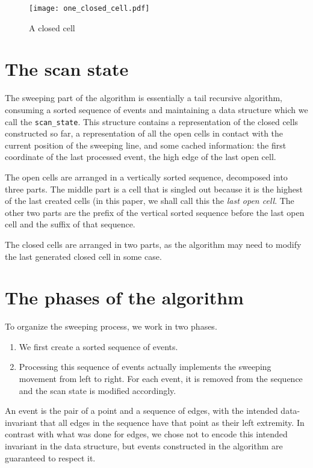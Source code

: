 \documentclass[a4paper, USenglish, cleveref, autoref, thm-restate, final]{lipics-v2021}
\begin{document}
\begin{figure}
\texttt{[image: one\_closed\_cell.pdf]}
\caption{A closed cell}
\end{figure}


\section{The scan state}

The sweeping part of the algorithm is essentially a tail recursive
algorithm, consuming a sorted sequence of events and
maintaining a data structure which we call the {\tt scan\_state}.  This
structure contains a representation of the closed cells constructed so
far, a representation of all the open cells in contact with the
current position of the sweeping line, and some cached information:
the first coordinate of the last processed event, the high edge of the
last open cell.

The open cells are arranged in a vertically sorted sequence,
decomposed into three parts.  The middle part is a cell that is singled
out because it is the highest of the last created cells (in this
paper, we shall call this the {\em last open cell}.  The other two
parts are the prefix of the vertical sorted sequence before the last
open cell and the suffix of that sequence.

The closed cells are arranged in two parts, as the algorithm may need
to modify the last generated closed cell in some case.

\section{The phases of the algorithm}
To organize the sweeping process, we work in two phases.
\begin{enumerate}
\item  We first
create a sorted sequence of events.
\item Processing this sequence of
  events actually implements the sweeping movement from left to right.
  For each event, it is removed from the sequence and the scan state
  is modified accordingly.
\end{enumerate}

An event is the pair of a point and a sequence of edges, with the
intended data-invariant
that all edges in the sequence have that point as their left
extremity.  In contrast with what was done for edges, we chose not
to encode this intended invariant in the data structure, but
events constructed in the algorithm are guaranteed to respect it.
\end{document}
